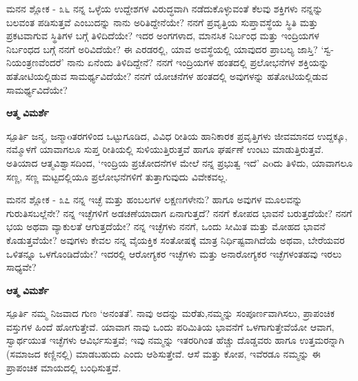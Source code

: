 \newpage
\begin{mananam}{\mananamfont ಮನನ ಶ್ಲೋಕ - ೩೬}
\mananamtext ನನ್ನ ಒಳ್ಳೆಯ ಉದ್ದೇಶಗಳ ವಿರುದ್ಧವಾಗಿ ನಡೆದುಕೊಳ್ಳುವಂತೆ ಕೆಲವು ಶಕ್ತಿಗಳು ನನ್ನನ್ನು ಬಲವಂತ ಪಡಿಸುತ್ತವೆ ಎಂಬುದನ್ನು ನಾನು ಅರಿತಿದ್ದೇನೆಯೇ? ನನಗೆ ಪ್ರವೃತ್ತಿಯ ಸುಪ್ತಾವಸ್ಥೆಯ ಸ್ಥಿತಿ ಮತ್ತು ಪ್ರಕಟವಾಗುವ ಸ್ಥಿತಿಗಳ ಬಗ್ಗೆ ತಿಳಿದಿದೆಯೇ? ಇದರ ಅಂಗಗಳಾದ, ಮಾನಸಿಕ ನಿರ್ಬಂಧ ಮತ್ತು ಇಂದ್ರಿಯಗಳ ನಿರ್ಬಂಧದ ಬಗ್ಗೆ ನನಗೆ ಅರಿವಿದೆಯೇ? ಈ ಎರಡರಲ್ಲಿ, ಯಾವ ಅವಸ್ಥೆಯಲ್ಲಿ ಯಾವುದರ ಪ್ರಾಬಲ್ಯ ಜಾಸ್ತಿ? ‘ಸ್ವ-ನಿಯಂತ್ರಣವೆಂದರೆ’ ನಾನು ಏನೆಂದು ತಿಳಿದಿದ್ದೇನೆ? ನನಗೆ ಇಂದ್ರಿಯಗಳ ಹಂತದಲ್ಲಿ ಪ್ರಲೋಭನೆಗಳ ಶಕ್ತಿಯನ್ನು ಹತೋಟಿಯಲ್ಲಿಡುವ ಸಾಮರ್ಥ್ಯವಿದೆಯೇ? ನನಗೆ ಯೋಚನೆಗಳ ಹಂತದಲ್ಲಿ ಅವುಗಳನ್ನು ಹತೋಟಿಯಲ್ಲಿಡುವ ಸಾಮರ್ಥ್ಯವಿದೆಯೇ? 
\end{mananam}
\WritingHand\enspace\textbf{ಆತ್ಮ ವಿಮರ್ಶೆ}\\
\begin{inspiration}{\mananamfont ಸ್ಪೂರ್ತಿ}
\mananamtext ಜನ್ಮ, ಜನ್ಮಾoತರಗಳಿಂದ ಒಟ್ಟುಗೂಡಿದ, ವಿವಿಧ ರೀತಿಯ ಹಾನಿಕಾರಕ ಪ್ರವೃತ್ತಿಗಳು ಜೀವಮಾನದ ಉದ್ದಕ್ಕೂ, ನಮ್ಮೊಳಗೆ ಯಾವಾಗಲೂ ಸುಪ್ತ ರೀತಿಯಲ್ಲಿ ಸುಳಿಯುತ್ತಿರುತ್ತವೆ ಹಾಗೂ ಘರ್ಷಣೆ ಉಂಟು ಮಾಡುತ್ತಿರುತ್ತವೆ. ಅತಿಯಾದ ಆತ್ಮವಿಶ್ವಾಸದಿಂದ, ‘ಇಂದ್ರಿಯ ಪ್ರಚೋದನೆಗಳ ಮೇಲೆ ನನ್ನ ಪ್ರಭುತ್ವ ಇದೆ’ ಎoದು ತಿಳಿದು, ಯಾವಾಗಲೂ ಸಣ್ಣ, ಸಣ್ಣ ಮಟ್ಟದಲ್ಲಿಯೂ ಪ್ರಲೋಭನೆಗಳಿಗೆ ತುತ್ತಾಗುವುದು ವಿವೇಕವಲ್ಲ. 
\end{inspiration}
\newpage

\begin{mananam}{\mananamfont ಮನನ ಶ್ಲೋಕ - ೩೭}
\mananamtext ನನ್ನ ಇಚ್ಛೆ ಮತ್ತು ಹಂಬಲಗಳ ಲಕ್ಷಣಗಳೇನು? ಹಾಗೂ ಅವುಗಳ ಮೂಲವನ್ನು ಗುರುತಿಸಬಲ್ಲೆನೇ? ನನ್ನ ಇಚ್ಛೆಗಳಿಗೆ ಅಡಚಣೆಯಾದಾಗ ಏನಾಗುತ್ತದೆ? ನನಗೆ ಕೋಪದ ಭಾವನೆ ಬರುತ್ತದೆಯೇ? ನನಗೆ ಭಯ ಅಥವಾ ವ್ಯಾಕುಲತೆ ಆಗುತ್ತದೆಯೇ? ನನ್ನ ಇಚ್ಛೆಗಳು ನನಗೆ, ಒಂದು ಸೀಮಿತ ಮತ್ತು ಮೋಹದ ಭಾವನೆ ಕೊಡುತ್ತವೆಯೇ? ಅವುಗಳು ಕೇವಲ ನನ್ನ ವೈಯಕ್ತಿಕ ಸಂತೋಷಕ್ಕೆ ಮಾತ್ರ ನಿರ್ಧಿಷ್ಟವಾಗಿದೆಯೆ ಅಥವಾ, ಬೇರೆಯವರ ಒಳಿತನ್ನೂ ಒಳಗೊಂಡಿದೆಯೇ? ಇದರಲ್ಲಿ ಆರೋಗ್ಯಕರ ಇಚ್ಛೆಗಳು ಮತ್ತು ಅನಾರೋಗ್ಯಕರ ಇಚ್ಛೆಗಳಂತಹವು ಇರಲು ಸಾಧ್ಯವೇ? 
\end{mananam}
\WritingHand\enspace\textbf{ಆತ್ಮ ವಿಮರ್ಶೆ}\\
\begin{inspiration}{\mananamfont ಸ್ಪೂರ್ತಿ}
\mananamtext ನಮ್ಮ ನಿಜವಾದ ಗುಣ ‘ಅನಂತತೆ’. ನಾವು ಅದನ್ನು ಮರೆತು,ನಮ್ಮನ್ನು ಸಂಪೂರ್ಣವಾಗಿಸಲು, ಪ್ರಾಪಂಚಿಕ ವಸ್ತುಗಳ ಹಿಂದೆ ಹೋಗುತ್ತೇವೆ. ಯಾವಾಗ ನಾವು ಒಂದು ಪರಿಮಿತಿಯ ಭಾವನೆಗೆ ಒಳಗಾಗುತ್ತೇವೆಯೋ ಆವಾಗ, ಸ್ವಾರ್ಥಯುತ ಇಚ್ಛೆಗಳು ಆವಿರ್ಭಸುತ್ತವೆ; ಇವು ನಮ್ಮನ್ನು ಇತರರಿಗಿಂತ ಹೆಚ್ಚು ದೊಡ್ಡವರು ಹಾಗೂ ಉತ್ತಮರನ್ನಾಗಿ (ಸಮಾಜದ ಕಣ್ಣಿನಲ್ಲಿ) ಮಾಡಬಹುದು ಎಂದು ಆಶಿಸುತ್ತೇವೆ. ಆಸೆ ಮತ್ತು ಕೋಪ, ಇವೆರಡೂ ನಮ್ಮನ್ನು ಈ ಪ್ರಾಪಂಚಿಕ ಮಾಯದಲ್ಲಿ ಬಂಧಿಸುತ್ತವೆ.
\end{inspiration}
\newpage

